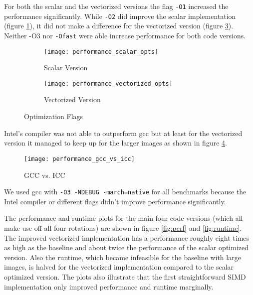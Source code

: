 For both the scalar and the vectorized versions the flag \texttt{-O1} increased
the performance significantly. While \texttt{-O2} did improve the scalar
implementation (figure \ref{fig:perf_scal}), it did not make a difference for
the vectorized version (figure \ref{fig:perf_vec}). Neither \textsc{-O3} nor
\texttt{-Ofast} were able increase performance for both code versions.

\begin{figure}[H]
  \begin{subfigure}[t]{\linewidth}
    \centering
    \texttt{[image: performance\_scalar\_opts]}
    \caption{Scalar Version}
    \label{fig:perf_scal}
  \end{subfigure}
  \begin{subfigure}[b]{\linewidth}
    \centering
    \texttt{[image: performance\_vectorized\_opts]}
    \caption{Vectorized Version}
    \label{fig:perf_vec}
  \end{subfigure}
  \caption{Optimization Flags}
\end{figure}


Intel's compiler was not able to outperform gcc but at least for the vectorized
version it managed to keep up for the larger images as shown in figure
\ref{fig:perf_gcc_vs_icc}.

\begin{figure}[H]
  \centering
  \texttt{[image: performance\_gcc\_vs\_icc]}
  \caption{GCC vs. ICC}
  \label{fig:perf_gcc_vs_icc}
\end{figure}

We used gcc with \verb|-O3 -NDEBUG -march=native| for all benchmarks because the
Intel compiler or different flags didn't improve performance significantly.

 The performance and runtime plots for the main four code
versions (which all make use off all four rotations) are shown in figure
\ref{fig:perf} and \ref{fig:runtime}. The improved vectorized implementation has
a performance roughly eight times as high as the baseline and about twice the
performance of the scalar optimized version. Also the runtime, which became
infeasible for the baseline with large images, is halved for the vectorized
implementation compared to the scalar optimized version. The plots also
illustrate that the first straightforward SIMD implementation only improved
performance and runtime marginally.

